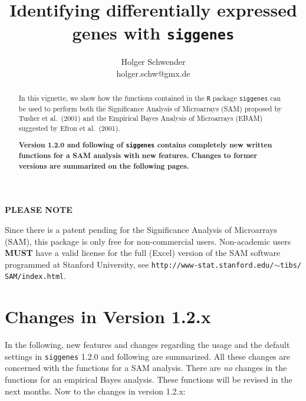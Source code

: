 \documentclass[a4paper]{article}
\begin{document}
\title{Identifying differentially expressed genes with
\texttt{siggenes}}

\author{Holger Schwender\\  holger.schw@gmx.de}
\date{}

\maketitle


\vspace{12pt}

\begin{abstract}
\noindent In this vignette, we show how the functions contained in
the \texttt{R} package \texttt{siggenes} can be used to perform
both the Significance Analysis of Microarrays (SAM) proposed by
Tusher et al.\ (2001) and the Empirical Bayes Analysis of
Microarrays (EBAM) suggested by Efron et al.\ (2001).

\textbf{Version 1.2.0 and following of \texttt{siggenes} contains completely
new written functions for a SAM analysis with new features. Changes to
former versions are summarized on the following pages.}
\end{abstract}
\thispagestyle{empty}


\vspace*{48pt} \centerline{\large \bf{PLEASE NOTE}} \vspace*{18pt}
\noindent Since there is a patent pending for the Significance
Analysis of Microarrays (SAM), this package is only free for
non-commercial users. Non-academic users \textbf{MUST} have a
valid license for the full (Excel) version of the SAM software
programmed at Stanford University, see
\texttt{http://www-stat.stanford.edu/$\sim$tibs/ SAM/index.html}.


\newpage

\section*{Changes in Version 1.2.x}

In the following, new features and changes regarding the usage and
the default settings in \texttt{siggenes} 1.2.0 and following are summarized.
All these changes are concerned with the functions for a SAM analysis.
There are \emph{no} changes in the functions for an empirical Bayes
analysis. These functions will be revised in the next months. Now to the
changes in version 1.2.x:
\end{document}
